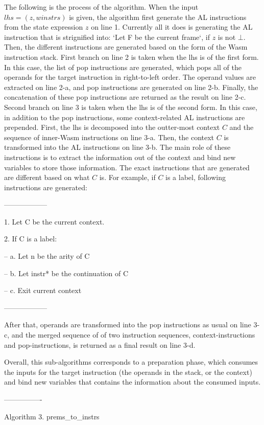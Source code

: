 The following is the process of the algorithm.
When the input $lhs = (z, winstrs)$ is given, the algorithm first
generate the AL instructions from the state expression $z$ on line 1.
Currently all it does is generating the AL instruction that is strignified into:
`Let F be the current frame`, if $z$ is not $\bot$. Then, the different instructions are
generated based on the form of the Wasm instruction stack. First branch on line 2 is taken
when the lhs is of the first form. In this case, the list of pop instructions are generated,
which pops all of the operands for the target instruction in right-to-left order.
The operand values are extracted on line 2-a, and pop instructions are generated on line 2-b.
Finally, the concatenation of these pop instructions are returned as the result on line 2-c.
Second branch on line 3 is taken when the lhs is of the second form.
In this case, in addition to the pop instructions, some context-related AL instructions are prepended.
First, the lhs is decomposed into the outter-most context $C$ and the sequence of inner-Wasm instructions on line 3-a.
Then, the context $C$ is transformed into the AL instructions on line 3-b.
The main role of these instructions is to extract the information out of the context
and bind new variables to store those information.
The exact instructions that are generated are different based on what $C$ is.
For example, if $C$ is a label, following instructions are generated:

------------------

1. Let C be the current context.

2. If C is a label:

-- a. Let n be the arity of C

-- b. Let instr* be the continuation of C

-- c. Exit current context

------------------

After that, operands are transformed into the pop instructions as usual on line 3-c,
and the merged sequence of of two instruction sequences, context-instructions and pop-instructions, is
returned as a final result on line 3-d.

Overall, this sub-algorithms corresponds to a preparation phase, which consumes the
inputs for the target instruction (the operands in the stack, or the context) and
bind new variables that contains the information about the consumed inputs.

----------------

Algorithm 3. prems\_to\_instrs

